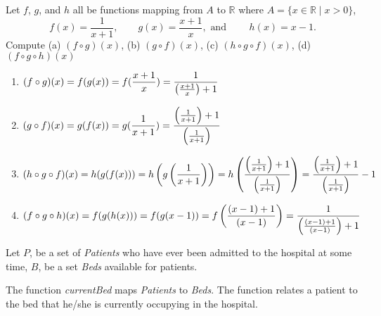  Let $f$, $g$, and $h$ all be functions mapping from $A$ to $\mathbb{R}$ where $A = \{x \in \mathbb{R} \;|\; x >0 \}$,
$$ f(x) = \frac{1}{x+1}, \qquad g(x) = \frac{x+1}{x}, \text{ and }\qquad h(x) =
x-1. $$
 Compute (a) $(f \circ g)(x)$, (b) $(g \circ f)(x)$, (c) $(h \circ g \circ f)(x)$, (d) $(f \circ g \circ h)(x)$
    \ifprintanswers
        \vspace{-5pt}
   	\fi
	\begin{solution}
	\begin{enumerate}[label=(\alph*),itemsep=3pt,parsep=3pt,topsep=0pt,partopsep=0pt]
	    \item $\displaystyle (f \circ g)(x) = f(g(x)) 
	      = f(\frac{x+1}{x}) 
	      = \frac{1}{\left(\frac{x+1}{x}\right) + 1}$
	    \item $\displaystyle (g \circ f)(x) = g(f(x)) 
	      = g(\frac{1}{x+1}) 
	      = \frac{\left(\frac{1}{x+1}\right)+1}{\left(\frac{1}{x+1}\right)}$
	    \item $\displaystyle (h \circ g \circ f)(x) = h(g(f(x)))
	      = h\left( g\left(\frac{1}{x+1} \right) \right)
	      = h\left( \frac{\left(\frac{1}{x+1}\right)+1}{\left(\frac{1}{x+1}\right)} \right)
	      = \frac{\left(\frac{1}{x+1}\right)+1}{\left(\frac{1}{x+1}\right)} - 1$
	    \item $\displaystyle (f \circ g \circ h)(x) = f(g(h(x))) 
	      = f(g(x-1)) 
	      = f\left(\frac{(x-1) +1}{(x-1)}\right) 
	      = \frac{1}{\left(\frac{(x-1) +1}{(x-1)}\right) + 1}$
	\end{enumerate}
	\end{solution}



	\ifprintanswers
		Let $P$, be a set of \textit{Patients} who have ever been admitted to the hospital at some time, $B$, be a set \textit{Beds} available for patients. 

		The function \textit{currentBed} maps \textit{Patients} to \textit{Beds}. The function relates a patient to the bed that he/she is currently occupying in the hospital. 

